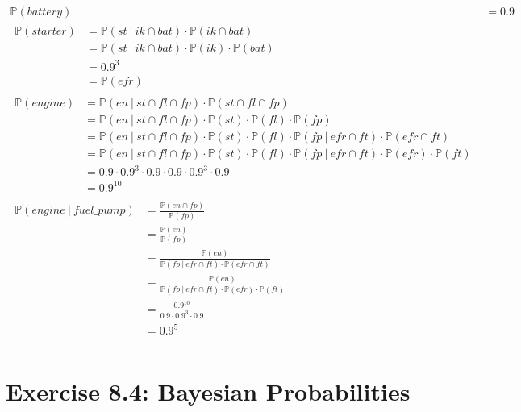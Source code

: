 \documentclass[a4paper]{scrartcl}
\newcommand{\prob}{\mathbb{P}}
\def \blattnr {8}
\begin{document}
\begin{align*}
    \prob(battery) &= \num{0,9} \\
    \begin{split}
        \prob(starter)
        &= \prob(st\ |\ ik \cap bat) \cdot \prob(ik \cap bat) \\
        &= \prob(st\ |\ ik \cap bat) \cdot \prob(ik) \cdot \prob(bat) \\
        &=\num{0,9}^3 \\
        &= \prob(efr)
    \end{split} \\
    \begin{split}
        \prob(engine)
        &= \prob(en\ |\ st \cap fl \cap fp) \cdot \prob(st \cap fl \cap fp) \\
        &= \prob(en\ |\ st \cap fl \cap fp) \cdot \prob(st) \cdot \prob(fl) \cdot \prob(fp) \\
        &= \prob(en\ |\ st \cap fl \cap fp) \cdot \prob(st) \cdot \prob(fl) \cdot \prob(fp\ |\ efr \cap ft) \cdot \prob(efr \cap ft) \\
        &= \prob(en\ |\ st \cap fl \cap fp) \cdot \prob(st) \cdot \prob(fl) \cdot \prob(fp\ |\ efr \cap ft) \cdot \prob(efr) \cdot \prob(ft) \\
        &= \num{0,9} \cdot \num{0,9}^3 \cdot \num{0,9} \cdot \num{0,9} \cdot \num{0,9}^3 \cdot \num{0,9} \\
        &= \num{0,9}^{10}
    \end{split} \\
    \begin{split}
        \prob(engine\ |\ fuel\_pump)
        &= \frac{\prob(en \cap fp)}{\prob(fp)} \\
        &= \frac{\prob(en)}{\prob(fp)} \\
        &= \frac{\prob(en)}{\prob(fp\ |\ efr \cap ft) \cdot \prob(efr \cap ft)} \\
        &= \frac{\prob(en)}{\prob(fp\ |\ efr \cap ft) \cdot \prob(efr) \cdot \prob(ft)} \\
        &= \frac{\num{0,9}^10}{\num{0,9} \cdot \num{0,9}^3 \cdot \num{0,9}} \\
        &= \num{0,9}^5 \\
    \end{split}
\end{align*}


\section*{Exercise \blattnr.4: Bayesian Probabilities}
\end{document}
